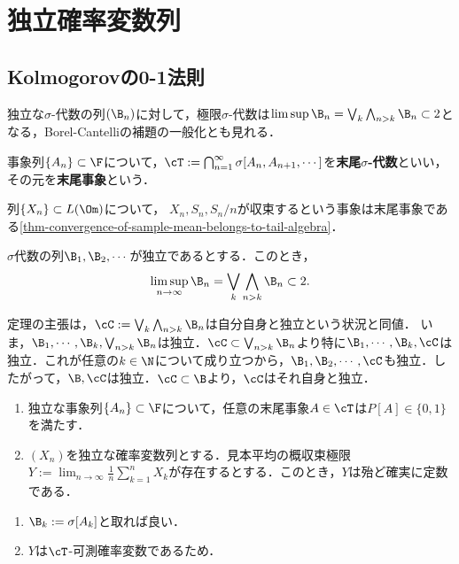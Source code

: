 \documentclass[uplatex,dvipdfmx]{jsreport}
\begin{document}
\section{独立確率変数列}

\subsection{Kolmogorovの0-1法則}

\begin{tcolorbox}[colframe=ForestGreen, colback=ForestGreen!10!white,breakable,colbacktitle=ForestGreen!40!white,coltitle=black,fonttitle=\bfseries\sffamily,
title=]
    独立な$\sigma$-代数の列$(\B_n)$に対して，極限$\sigma$-代数は$\limsup\B_n=\bigvee_k\bigwedge_{n>k}\B_n\subset 2$となる，Borel-Cantelliの補題の一般化とも見れる．
\end{tcolorbox}

\begin{definition}
    事象列$\{A_n\}\subset\F$について，$\cT:=\bigcap_{n=1}^\infty\sigma[A_n,A_{n+1},\cdots]$を\textbf{末尾$\sigma$-代数}といい，その元を\textbf{末尾事象}という．
\end{definition}
\begin{example}
    列$\{X_n\}\subset L(\Om)$について，
    $X_n,S_n,S_n/n$が収束するという事象は末尾事象である\ref{thm-convergence-of-sample-mean-belongs-to-tail-algebra}．
\end{example}

\begin{theorem}[Kolmogorov]
    $\sigma$代数の列$\B_1,\B_2,\cdots$が独立であるとする．このとき，
    \[\limsup_{n\to\infty}\B_n=\bigvee_k\bigwedge_{n>k}\B_n\subset 2.\]
\end{theorem}
\begin{Proof}
    定理の主張は，$\cC:=\bigvee_k\bigwedge_{n>k}\B_n$は自分自身と独立という状況と同値．
    いま，$\B_1,\cdots,\B_k,\bigvee_{n>k}\B_n$は独立．$\cC\subset\bigvee_{n>k}\B_n$より特に$\B_1,\cdots,\B_k,\cC$は独立．これが任意の$k\in\N$について成り立つから，$\B_1,\B_2,\cdots,\cC$も独立．したがって，$\B,\cC$は独立．$\cC\subset\B$より，$\cC$はそれ自身と独立．
\end{Proof}

\begin{corollary}[見本平均は殆ど確実な定数に概収束または概発散する]\mbox{}
    \begin{enumerate}
        \item 独立な事象列$\{A_n\}\subset\F$について，任意の末尾事象$A\in\cT$は$P[A]\in\{0,1\}$を満たす．
        \item $(X_n)$を独立な確率変数列とする．見本平均の概収束極限$Y:=\lim_{n\to\infty}\frac{1}{n}\sum_{k=1}^nX_k$が存在するとする．このとき，$Y$は殆ど確実に定数である．
    \end{enumerate}
\end{corollary}
\begin{Proof}\mbox{}
    \begin{enumerate}
        \item $\B_k:=\sigma[A_k]$と取れば良い．
        \item $Y$は$\cT$-可測確率変数であるため．
    \end{enumerate}
\end{Proof}
\end{document}
